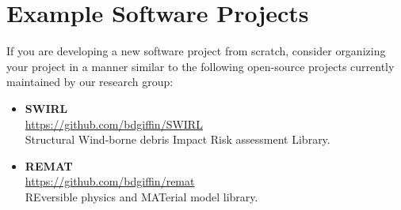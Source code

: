 \documentclass[12pt,a4paper,article,oneside]{memoir} %
\begin{document}
\section{Example Software Projects} \label{sec:example_software_projects}

If you are developing a new software project from scratch, consider organizing your project in a manner similar to the following open-source projects currently maintained by our research group:
\begin{itemize}
\item \textbf{SWIRL} \\ \url{https://github.com/bdgiffin/SWIRL} \\ Structural Wind-borne debris Impact Risk assessment Library.
\item \textbf{REMAT} \\ \url{https://github.com/bdgiffin/remat} \\ REversible physics and MATerial model library.
\end{itemize}


\newpage




\end{document}
